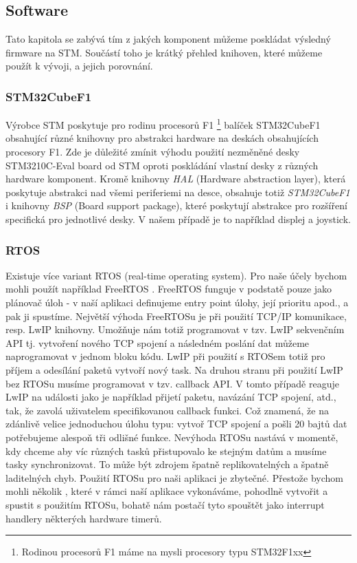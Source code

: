 \subsection{Software}
Tato kapitola se zabývá tím z jakých komponent můžeme poskládat výsledný firmware na STM.
Součástí toho je krátký přehled knihoven, které můžeme použít k vývoji, a jejich porovnání.

\subsubsection{STM32CubeF1}
Výrobce STM poskytuje pro rodinu procesorů F1 \footnote{Rodinou procesorů F1 máme na mysli procesory typu STM32F1xx}
balíček STM32CubeF1 \cite{STM32CubeF1} obsahující různé knihovny pro abstrakci hardware na deskách obsahujících procesory F1.
Zde je důležité zmínit výhodu použití nezměněné desky STM3210C-Eval board od STM oproti poskládání
vlastní desky z různých hardware komponent.
Kromě knihovny \emph{HAL} (Hardware abstraction layer), která poskytuje abstrakci nad všemi
periferiemi na desce, obsahuje totiž \emph{STM32CubeF1} i knihovny \emph{BSP} (Board support package),
které poskytují abstrakce pro rozšíření specifická pro jednotlivé desky.
V našem případě je to například displej a joystick.

\subsubsection{RTOS}
Existuje více variant RTOS (real-time operating system).
Pro naše účely bychom mohli použít například FreeRTOS \cite{FreeRTOS}.
FreeRTOS funguje v podstatě pouze jako plánovač úloh - v naší aplikaci definujeme entry point
úlohy, její prioritu apod., a pak ji spustíme.
Největší výhoda FreeRTOSu je při použití TCP/IP komunikace, resp. LwIP knihovny.
Umožňuje nám totiž programovat v tzv. LwIP sekvenčním API tj. vytvoření nového TCP spojení
a následném poslání dat můžeme naprogramovat v jednom bloku kódu.
LwIP při použití s RTOSem totiž pro příjem a odesílání paketů vytvoří nový task.
Na druhou stranu při použití LwIP bez RTOSu musíme programovat v tzv. callback API.
V tomto případě reaguje LwIP na události jako je například přijetí paketu, navázání TCP spojení, atd.,
tak, že zavolá uživatelem specifikovanou callback funkci.
Což znamená, že na zdánlivě velice jednoduchou úlohu typu: vytvoř TCP spojení a pošli 20 bajtů dat
potřebujeme alespoň tři odlišné funkce.
Nevýhoda RTOSu nastává v momentě, kdy chceme aby víc různých tasků přistupovalo ke stejným datům
a musíme tasky synchronizovat.
To může být zdrojem špatně replikovatelných a špatně laditelných chyb.
Použití RTOSu pro naši aplikaci je zbytečné.
Přestože bychom mohli několik , které v rámci naší aplikace vykonáváme, pohodlně vytvořit
a spustit s použitím RTOSu, bohatě nám postačí tyto  spouštět jako interrupt handlery některých
hardware timerů.

